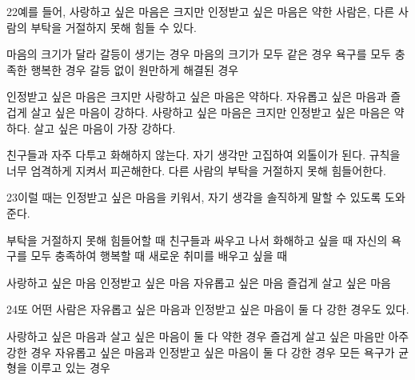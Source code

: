 \documentclass[fs85,seriesRus]{korfarm-base}
\begin{document}
\begin{kfSentenceUnit}{22}{예를 들어, 사랑하고 싶은 마음은 크지만 인정받고 싶은 마음은 약한 사람은, 다른 사람의 부탁을 거절하지 못해 힘들 수 있다.}
\begin{kfChoices}
\kfChoice 마음의 크기가 달라 갈등이 생기는 경우
\kfChoice 마음의 크기가 모두 같은 경우
\kfChoice 욕구를 모두 충족한 행복한 경우
\kfChoice 갈등 없이 원만하게 해결된 경우
\end{kfChoices}
\begin{kfChoices}
\kfChoice 인정받고 싶은 마음은 크지만 사랑하고 싶은 마음은 약하다.
\kfChoice 자유롭고 싶은 마음과 즐겁게 살고 싶은 마음이 강하다.
\kfChoice 사랑하고 싶은 마음은 크지만 인정받고 싶은 마음은 약하다.
\kfChoice 살고 싶은 마음이 가장 강하다.
\end{kfChoices}
\begin{kfChoices}
\kfChoice 친구들과 자주 다투고 화해하지 않는다.
\kfChoice 자기 생각만 고집하여 외톨이가 된다.
\kfChoice 규칙을 너무 엄격하게 지켜서 피곤해한다.
\kfChoice 다른 사람의 부탁을 거절하지 못해 힘들어한다.
\end{kfChoices}
\end{kfSentenceUnit}

\begin{kfSentenceUnit}{23}{이럴 때는 인정받고 싶은 마음을 키워서, 자기 생각을 솔직하게 말할 수 있도록 도와준다.}
\begin{kfChoices}
\kfChoice 부탁을 거절하지 못해 힘들어할 때
\kfChoice 친구들과 싸우고 나서 화해하고 싶을 때
\kfChoice 자신의 욕구를 모두 충족하여 행복할 때
\kfChoice 새로운 취미를 배우고 싶을 때
\end{kfChoices}
\begin{kfChoices}
\kfChoice 사랑하고 싶은 마음
\kfChoice 인정받고 싶은 마음
\kfChoice 자유롭고 싶은 마음
\kfChoice 즐겁게 살고 싶은 마음
\end{kfChoices}
\end{kfSentenceUnit}

\begin{kfSentenceUnit}{24}{또 어떤 사람은 자유롭고 싶은 마음과 인정받고 싶은 마음이 둘 다 강한 경우도 있다.}
\begin{kfChoices}
\kfChoice 사랑하고 싶은 마음과 살고 싶은 마음이 둘 다 약한 경우
\kfChoice 즐겁게 살고 싶은 마음만 아주 강한 경우
\kfChoice 자유롭고 싶은 마음과 인정받고 싶은 마음이 둘 다 강한 경우
\kfChoice 모든 욕구가 균형을 이루고 있는 경우
\end{kfChoices}
\end{kfSentenceUnit}
\end{document}
